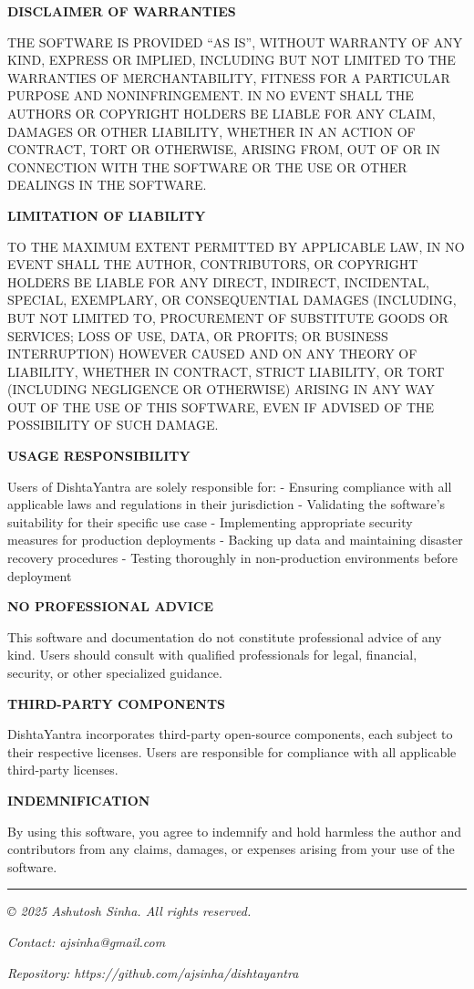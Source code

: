\documentclass[
]{article}
\begin{document}
\textbf{DISCLAIMER OF WARRANTIES}

THE SOFTWARE IS PROVIDED ``AS IS'', WITHOUT WARRANTY OF ANY KIND,
EXPRESS OR IMPLIED, INCLUDING BUT NOT LIMITED TO THE WARRANTIES OF
MERCHANTABILITY, FITNESS FOR A PARTICULAR PURPOSE AND NONINFRINGEMENT.
IN NO EVENT SHALL THE AUTHORS OR COPYRIGHT HOLDERS BE LIABLE FOR ANY
CLAIM, DAMAGES OR OTHER LIABILITY, WHETHER IN AN ACTION OF CONTRACT,
TORT OR OTHERWISE, ARISING FROM, OUT OF OR IN CONNECTION WITH THE
SOFTWARE OR THE USE OR OTHER DEALINGS IN THE SOFTWARE.

\textbf{LIMITATION OF LIABILITY}

TO THE MAXIMUM EXTENT PERMITTED BY APPLICABLE LAW, IN NO EVENT SHALL THE
AUTHOR, CONTRIBUTORS, OR COPYRIGHT HOLDERS BE LIABLE FOR ANY DIRECT,
INDIRECT, INCIDENTAL, SPECIAL, EXEMPLARY, OR CONSEQUENTIAL DAMAGES
(INCLUDING, BUT NOT LIMITED TO, PROCUREMENT OF SUBSTITUTE GOODS OR
SERVICES; LOSS OF USE, DATA, OR PROFITS; OR BUSINESS INTERRUPTION)
HOWEVER CAUSED AND ON ANY THEORY OF LIABILITY, WHETHER IN CONTRACT,
STRICT LIABILITY, OR TORT (INCLUDING NEGLIGENCE OR OTHERWISE) ARISING IN
ANY WAY OUT OF THE USE OF THIS SOFTWARE, EVEN IF ADVISED OF THE
POSSIBILITY OF SUCH DAMAGE.

\textbf{USAGE RESPONSIBILITY}

Users of DishtaYantra are solely responsible for: - Ensuring compliance
with all applicable laws and regulations in their jurisdiction -
Validating the software's suitability for their specific use case -
Implementing appropriate security measures for production deployments -
Backing up data and maintaining disaster recovery procedures - Testing
thoroughly in non-production environments before deployment

\textbf{NO PROFESSIONAL ADVICE}

This software and documentation do not constitute professional advice of
any kind. Users should consult with qualified professionals for legal,
financial, security, or other specialized guidance.

\textbf{THIRD-PARTY COMPONENTS}

DishtaYantra incorporates third-party open-source components, each
subject to their respective licenses. Users are responsible for
compliance with all applicable third-party licenses.

\textbf{INDEMNIFICATION}

By using this software, you agree to indemnify and hold harmless the
author and contributors from any claims, damages, or expenses arising
from your use of the software.

\begin{center}\rule{0.5\linewidth}{0.5pt}\end{center}

\emph{© 2025 Ashutosh Sinha. All rights reserved.}

\emph{Contact: ajsinha@gmail.com}

\emph{Repository: https://github.com/ajsinha/dishtayantra}
\end{document}
